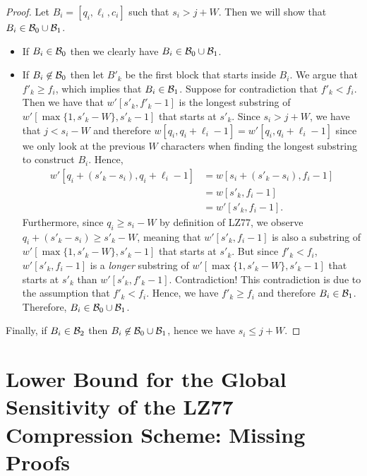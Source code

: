 \begin{proof}
Let $B_i=[q_i,\ell_i,c_i]$ such that $s_i>j+W$. Then we will show that $B_i\in{\ensuremath{\mathcal{B}}}_0\cup{\ensuremath{\mathcal{B}}}_1$.
\begin{itemize}
    \item If $B_i\in{\ensuremath{\mathcal{B}}}_0$ then we clearly have $B_i\in{\ensuremath{\mathcal{B}}}_0\cup{\ensuremath{\mathcal{B}}}_1$.
    \item If $B_i\not\in{\ensuremath{\mathcal{B}}}_0$ then let $B'_{k}$ be the first block that starts inside $B_i$. We argue that $f'_{k}\geq f_i$, which implies that $B_i\in{\ensuremath{\mathcal{B}}}_1$. Suppose for contradiction that $f'_{k}<f_i$. Then we have that $w'[s'_{k},f'_{k}-1]$ is the longest substring of $w'[\max\{1,s'_{k}-W\},s'_{k}-1]$ that starts at $s'_{k}$. 
    Since $s_i>j+W$, we have that $j<s_i-W$ and therefore $w[q_i,q_i+\ell_i-1]=w'[q_i,q_i+\ell_i-1]$ since we only look at the previous $W$ characters when finding the longest substring to construct $B_i$. Hence,
    \begin{align*}
        w'[q_i+(s'_{k}-s_i),q_i+\ell_i-1] &= w[s_i+(s'_{k}-s_i),f_i-1]\\
        &=w[s'_{k},f_i-1]\\
        &=w'[s'_{k},f_i-1].
    \end{align*}
    Furthermore, since $q_i\geq s_i-W$ by definition of LZ77, we observe $q_i+(s'_{k}-s_i)\geq s'_{k}-W$, meaning that $w'[s'_{k},f_i-1]$ is also a substring of $w'[\max\{1,s'_{k}-W\},s'_{k}-1]$ that starts at $s'_{k}$. But since $f'_{k}<f_i$, $w'[s'_{k},f_i-1]$ is a \emph{longer} substring of $w'[\max\{1,s'_{k}-W\},s'_{k}-1]$ that starts at $s'_{k}$ than $w'[s'_{k},f'_{k}-1]$. Contradiction! This contradiction is due to the assumption that $f'_{k}<f_i$. Hence, we have $f'_{k}\geq f_i$ and therefore $B_i\in{\ensuremath{\mathcal{B}}}_1$. Therefore, $B_i\in{\ensuremath{\mathcal{B}}}_0\cup{\ensuremath{\mathcal{B}}}_1$.
\end{itemize}
Finally, if $B_i\in{\ensuremath{\mathcal{B}}}_2$ then $B_i\not\in{\ensuremath{\mathcal{B}}}_0\cup{\ensuremath{\mathcal{B}}}_1$, hence we have $s_i\leq j+W$.
\end{proof}

\section{Lower Bound for the Global Sensitivity of the LZ77 Compression Scheme: Missing Proofs}


